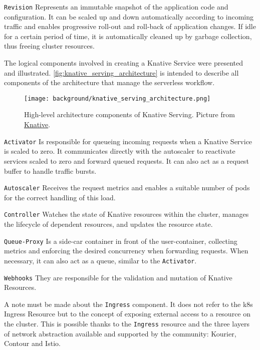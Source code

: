 \documentclass[../thesis.tex]{subfiles}
\begin{document}
\texttt{Revision} Represents an immutable snapshot of the application code and configuration. It can be scaled up and down automatically according to incoming traffic and enables progressive roll-out and roll-back of application changes. If idle for a certain period of time, it is automatically cleaned up by garbage collection, thus freeing cluster resources.

The logical components involved in creating a Knative Service were presented and illustrated. \autoref{fig:knative_serving_architecture} is intended to describe all components of the architecture that manage the serverless workflow.

\begin{figure}[H]
    \centering
    \texttt{[image: background/knative\_serving\_architecture.png]}
    \caption[Knative Serving architecture components]{High-level architecture components of Knative Serving. Picture from \href{https://knative.dev/docs/serving/architecture/\#diagram}{Knative}.}
    \label{fig:knative_serving_architecture}
\end{figure}

\texttt{Activator} Is responsible for queueing incoming requests when a Knative Service is scaled to zero. It communicates directly with the autoscaler to reactivate services scaled to zero and forward queued requests. It can also act as a request buffer to handle traffic bursts.

\texttt{Autoscaler} Receives the request metrics and enables a suitable number of \gls{pod}s for the correct handling of this load.

\texttt{Controller} Watches the state of Knative resources within the cluster, manages the lifecycle of dependent resources, and updates the resource state.

\texttt{Queue-Proxy} Is a side-car \gls{container} in front of the user-container, collecting metrics and enforcing the desired concurrency when forwarding requests. When necessary, it can also act as a queue, similar to the \texttt{Activator}.

\texttt{Webhooks} They are responsible for the validation and mutation of Knative Resources.

A note must be made about the \texttt{Ingress} component. It does not refer to the \gls{k8s} Ingress Resource but to the concept of exposing external access to a resource on the cluster. This is possible thanks to the \texttt{Ingress} resource and the three layers of network abstraction available and supported by the community: Kourier, Contour and Istio.
\end{document}
